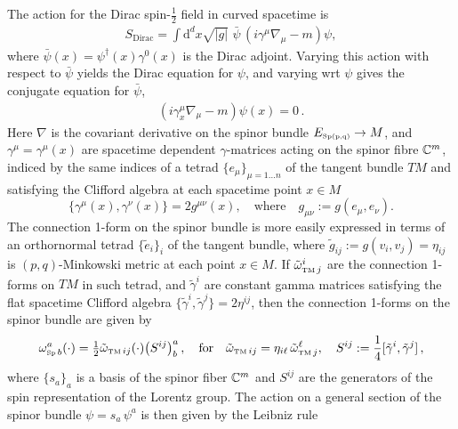 \documentclass[../geometry_main.tex]{subfiles}
\begin{document}
\begin{mytheorem}
%
The action for the Dirac spin-$\tfrac12$ field in curved spacetime is
\begin{align}
    S_\text{Dirac} = \int \mathrm{d}^d x \sqrt{|g|} \,\, \bar{\psi}\, (i \gamma^\mu \nabla_\mu - m) \psi,
\end{align}
where $\bar{\psi}(x) = \psi^\dagger(x) \gamma^0(x)$ is the Dirac adjoint.
Varying this action with respect to $\bar{\psi}$ yields the Dirac equation for $\psi$, and varying wrt $\psi$ gives the conjugate equation for $\bar{\psi}$,
\begin{align}
    (i \gamma^\mu_x \nabla_\mu - m) \psi(x) = 0\,.
\end{align}
Here $\nabla$ is the covariant derivative on the spinor bundle $E_{\text{\tiny Sp(p,q)}}\to M$, and $\gamma^\mu=\gamma^\mu(x)$ are spacetime dependent $\gamma$-matrices acting on the spinor fibre $\mathbb{C}^m$, indiced by the same indices of a tetrad $\{e_{\mu}\}_{\mu=1\dots n}$ of the tangent bundle $TM$ and satisfying the Clifford algebra at each spacetime point $x\in M$
\begin{equation}
    \{\gamma^\mu(x), \gamma^\nu(x)\} = 2 g^{\mu\nu}(x),\quad \text{where}\quad g_{\mu\nu}:=g(e_\mu,e_\nu).
\end{equation}
The connection 1-form on the spinor bundle is more easily expressed in terms of an orthornormal tetrad $\{\tilde{e}_i\}_i$ of the tangent bundle, where $\tilde{g}_{ij}:=g(v_i,v_j)=\eta_{ij}$ is $(p,q)$-Minkowski metric at each point $x\in M$.
If $\tilde{\omega}_{\text{\tiny TM}\,j}^i$ are the connection 1-forms on $TM$ in such tetrad, and $\tilde{\gamma}^i$ are constant gamma matrices satisfying the flat spacetime Clifford algebra $\{\tilde{\gamma}^i,\tilde{\gamma}^j\}=2 \eta^{ij}$, then the connection 1-forms on the spinor bundle are given by
\begin{align}
    \omega_{\text{\tiny Sp}\,b}^a(\cdot) = \tfrac{1}{2} \tilde{\omega}_{\text{\tiny TM}\,ij}(\cdot) \big(S^{ij}\big)^a_{b}\,,\quad \text{for}\quad \tilde{\omega}_{\text{\tiny TM}\,ij}= \eta_{i\ell}\,\tilde{\omega}^\ell_{\text{\tiny TM}\,j},\quad S^{ij} := \frac{1}{4} [\tilde{\gamma}^i, \tilde{\gamma}^j]\,,
\end{align}
where $\{s_a\}_a$ is a basis of the spinor fiber $\mathbb{C}^m$ and $S^{ij}$ are the generators of the spin representation of the Lorentz group.
The action on a general section of the spinor bundle $\psi=s_a\, \psi^a$ is then given by the Leibniz rule
\begin{align}

\end{align}
\end{mytheorem}
\end{document}
